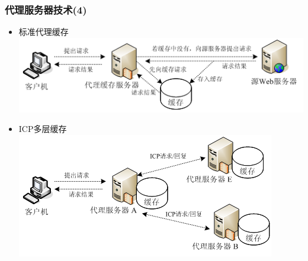 \documentclass[xcolor=svgnames,presentation]{beamer}
\begin{document}
\begin{frame}
\frametitle{代理服务器技术(4)}
\label{sec-1-14}
\begin{itemize}

\item 标准代理缓存\\
\label{sec-1-14-1}%
\includegraphics[width=.9\linewidth]{img/agent3.png}

\item ICP多层缓存\\
\label{sec-1-14-2}%
\includegraphics[width=.9\linewidth]{img/agent4.png}
\end{itemize} %
\end{frame}
\end{document}
